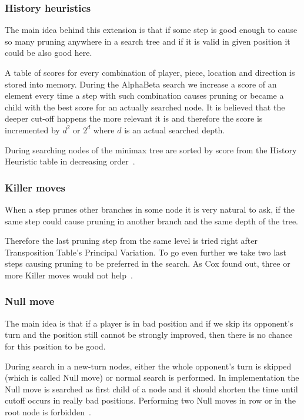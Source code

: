 	\subsubsection{History heuristics}
	The main idea behind this extension is that if some step is good enough
	to cause so many pruning anywhere in a search tree and if it is valid in
	given position it could be also good here.

	A table of scores for every combination of player, piece, location and
	direction is stored into memory. During the AlphaBeta search we increase a
	score of an element every time a step with such combination causes pruning
	or became a child with the best score for an actually searched node. It is
	believed that the deeper cut-off happens the more relevant it is and
	therefore the score is incremented by $d^2$ or $2^d$ where $d$ is an actual
	searched depth.

	During searching nodes of the minimax tree are sorted by score from the
	History Heuristic table in decreasing order~\cite{COX}.

	\subsubsection{Killer moves}
	When a step prunes other branches in some node it is very natural to ask,
	if the same step could cause pruning in another branch and the same depth
	of the tree.
	
	Therefore  the last pruning step from the same level is tried right after
	Transposition Table's Principal Variation. To go even further we take two
	last steps causing pruning to be preferred in the search. As Cox found out,
	three or more Killer moves would not help~\cite{COX}.

	\subsubsection{Null move}
	The main idea is that if a player is in bad position and if we skip its
	opponent's turn and the position still cannot be strongly improved, then
	there is no chance for this position to be good.

	During search in a new-turn nodes, either the whole opponent's turn is
	skipped (which is called Null move) or normal search is performed. In
	implementation the Null move is searched as first child of a node and it
	should shorten the time until cutoff occurs in really bad positions.
	Performing two Null moves in row or in the root node is
	forbidden~\cite{COX}.


